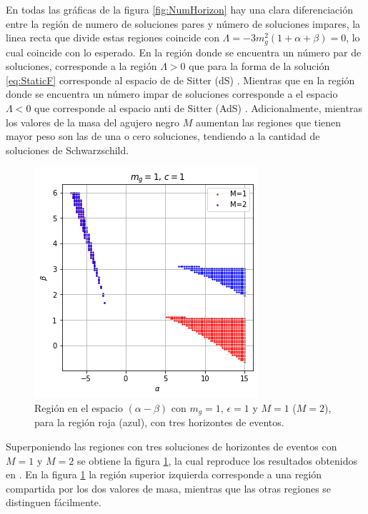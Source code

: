 En todas las gráficas de la figura \ref{fig:NumHorizon} hay una clara diferenciación entre la región de numero de soluciones pares y número de soluciones impares, la linea recta que divide estas regiones coincide con $\Lambda=-3m_g^2(1+\alpha+\beta)=0$, lo cual coincide con lo esperado. En la región donde se encuentra un número par de soluciones, corresponde a la región $\Lambda>0$  que para la forma de la solución \eqref{eq:StaticF} corresponde al espacio de de Sitter (dS) \cite{AClassOfBlackHoles}. Mientras que en la región donde se encuentra un número impar de soluciones corresponde a el espacio $\Lambda<0$ que corresponde al espacio anti de Sitter (AdS) \cite{AClassOfBlackHoles}. Adicionalmente, mientras los valores de la masa del agujero negro $M$ aumentan las regiones que tienen mayor peso son las de una o cero soluciones, tendiendo a la cantidad de soluciones de Schwarzschild.\\

 
 \begin{figure}[H]
     \centering
     \includegraphics[scale=0.45]{SoluciónEstática/Horizonte de Eventos/Artículo.png}
     \caption{Región en el espacio $(\alpha-\beta)$ con $m_g=1$, $\epsilon=1$ y $M=1$ ($M=2$), para la región roja (azul), con tres horizontes de eventos.}
     \label{fig:articleHorizons}
 \end{figure}
 
   Superponiendo las regiones con tres soluciones de horizontes de eventos con $M=1$ y $M=2$ se obtiene la figura \ref{fig:articleHorizons}, la cual reproduce los resultados obtenidos en \cite{AClassOfBlackHoles}. En la figura \ref{fig:articleHorizons} la región superior izquierda corresponde a una región compartida por los dos valores de masa, mientras que las otras regiones se distinguen fácilmente.\\
 
